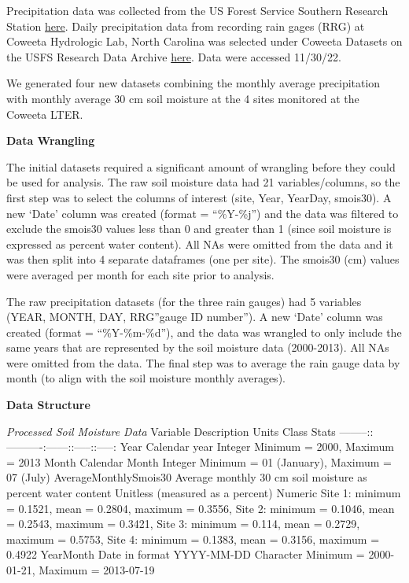 \documentclass[
  12pt,
]{article}
\begin{document}
Precipitation data was collected from the US Forest Service Southern
Research Station
\href{https://www.srs.fs.usda.gov/coweeta/tools-and-data/}{here}. Daily
precipitation data from recording rain gages (RRG) at Coweeta Hydrologic
Lab, North Carolina was selected under Coweeta Datasets on the USFS
Research Data Archive
\href{https://www.fs.usda.gov/rds/archive/Catalog/RDS-2017-0031}{here}.
Data were accessed 11/30/22.

We generated four new datasets combining the monthly average
precipitation with monthly average 30 cm soil moisture at the 4 sites
monitored at the Coweeta LTER.

\textbf{Data Wrangling}

The initial datasets required a significant amount of wrangling before
they could be used for analysis. The raw soil moisture data had 21
variables/columns, so the first step was to select the columns of
interest (site, Year, YearDay, smois30). A new `Date' column was created
(format = ``\%Y-\%j'') and the data was filtered to exclude the smois30
values less than 0 and greater than 1 (since soil moisture is expressed
as percent water content). All NAs were omitted from the data and it was
then split into 4 separate dataframes (one per site). The smois30 (cm)
values were averaged per month for each site prior to analysis.

The raw precipitation datasets (for the three rain gauges) had 5
variables (YEAR, MONTH, DAY, RRG''gauge ID number''). A new `Date'
column was created (format = ``\%Y-\%m-\%d''), and the data was wrangled
to only include the same years that are represented by the soil moisture
data (2000-2013). All NAs were omitted from the data. The final step was
to average the rain gauge data by month (to align with the soil moisture
monthly averages).

\textbf{Data Structure}

\emph{Processed Soil Moisture Data} \textbar Variable \textbar{}
Description \textbar{} Units \textbar{} Class \textbar{} Stats\textbar{}
\textbar--------:\textbar:----------:\textbar------:\textbar:-----:\textbar:-----:\textbar{}
\textbar Year\textbar{} Calendar year \textbar{} \textbar{} Integer
\textbar{} Minimum = 2000, Maximum = 2013\textbar{}
\textbar Month\textbar{} Calendar Month \textbar{} \textbar{} Integer
\textbar{} Minimum = 01 (January), Maximum = 07 (July)\textbar{}
\textbar AverageMonthlySmois30\textbar{} Average monthly 30 cm soil
moisture as percent water content \textbar{} Unitless (measured as a
percent) \textbar{} Numeric \textbar{} Site 1: minimum = 0.1521, mean =
0.2804, maximum = 0.3556, Site 2: minimum = 0.1046, mean = 0.2543,
maximum = 0.3421, Site 3: minimum = 0.114, mean = 0.2729, maximum =
0.5753, Site 4: minimum = 0.1383, mean = 0.3156, maximum = 0.4922
\textbar{} \textbar YearMonth\textbar{} Date in format YYYY-MM-DD
\textbar{} \textbar{} Character \textbar{} Minimum = 2000-01-21, Maximum
= 2013-07-19\textbar{}
\end{document}
